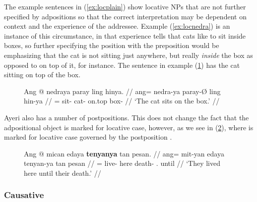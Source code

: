 The example sentences in (\ref{ex:locplain}) show locative NPs that are not
further specified by adpositions so that the correct interpretation may be
dependent on context and the experience of the addressee. Example
(\ref{ex:locnedra}) is an instance of this circumstance, in that experience
tells that cats like to sit inside boxes, so further specifying the position
with the preposition  would be emphasizing that the
cat is not sitting just anywhere, but really \emph{inside} the box as opposed
to on top of it, for instance. The sentence in example (\ref{ex:expladp}) has
the cat sitting on top of the box.

\begin{figure}[h]
\ex\label{ex:expladp}
\begingl
	\gla Ang @ nedraya paray ling hinya. //
	\glb ang= nedra-ya paray-Ø ling hin-ya //
	\glc \AgtT{}= sit-\TsgM{} cat-\Top{} on.top box-\Loc{} //
	\glft `The cat sits on the box.' //
\endgl\xe
\end{figure}

Ayeri also has a number of postpositions. This does not change the fact that
the adpositional object is marked for locative case, however, as we see in
(\ref{ex:locpostpos}), where  is marked for locative 
case governed by the postposition .

\begin{figure}[h]
\ex\label{ex:locpostpos}%
\begingl
	\gla Ang @ mican edaya \textbf{tenyanya} tan pesan. //
	\glb ang= mit-yan edaya tenyan-ya tan pesan //
	\glc \AgtT{}= live-\TplM{} here death-\Loc{} \TplM{}.\Gen{} until //
	\glft `They lived here until their death.' //
\endgl\xe
\end{figure}


\subsubsection{Causative}
\label{subsubsec:causative}

